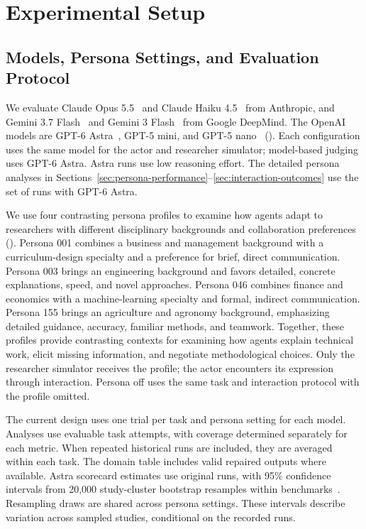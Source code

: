 \section{Experimental Setup}
\label{sec:experimental-setup}

\subsection{Models, Persona Settings, and Evaluation Protocol}
\label{sec:run-coverage}
\label{sec:statistical-protocol}
We evaluate Claude Opus 5.5~\cite{anthropic2026opus55} and
Claude Haiku 4.5~\cite{anthropic2025haiku45} from Anthropic,
and Gemini 3.7 Flash~\cite{deepmind2026gemini37flash} and
Gemini 3 Flash~\cite{deepmind2025gemini3flash} from Google DeepMind.
The OpenAI models are GPT-6 Astra~\cite{openai2026astra},
GPT-5 mini, and GPT-5 nano~\cite{openai2025gpt5}
(). Each configuration uses the same model
for the actor and researcher simulator; model-based judging uses GPT-6 Astra.
Astra runs use low reasoning effort. The detailed persona analyses in
Sections~\ref{sec:persona-performance}--\ref{sec:interaction-outcomes}
use the set of runs with GPT-6 Astra.

We use four contrasting persona profiles to examine how agents adapt to
researchers with different disciplinary backgrounds and collaboration
preferences (). Persona 001 combines a business and management background
with a curriculum-design specialty and a preference for brief, direct
communication. Persona 003 brings an engineering background and favors
detailed, concrete explanations, speed, and novel approaches. Persona 046
combines finance and economics with a machine-learning specialty and formal,
indirect communication. Persona 155 brings an agriculture and agronomy
background, emphasizing detailed guidance, accuracy, familiar methods, and
teamwork. Together, these profiles provide contrasting contexts for examining
how agents explain technical work, elicit missing information, and negotiate
methodological choices. Only the researcher simulator receives the profile;
the actor encounters its expression through interaction. Persona off uses
the same task and interaction protocol with the profile omitted.

The current design uses one trial per task and persona setting for each model.
Analyses use evaluable task attempts, with coverage determined separately
for each metric. When repeated historical runs are included, they are
averaged within each task. The domain table includes valid repaired outputs
where available. Astra scorecard estimates use original runs, with 95\%
confidence intervals from 20,000 study-cluster bootstrap resamples within
benchmarks~\cite{field2007bootstrap}. Resampling draws are shared across
persona settings. These intervals describe variation across sampled studies,
conditional on the recorded runs.

